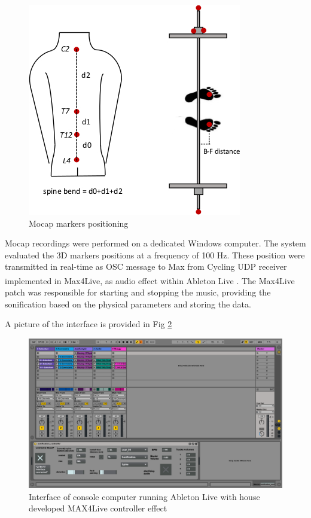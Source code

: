 \documentclass[10pt,letterpaper]{article}
\begin{document}
\begin{figure}[!h]
\center
\includegraphics[width=.8\textwidth]{figures/Sketch_spine_final.jpg}
\caption{Mocap markers positioning}
\label{fig:sketch_quantities}      
\end{figure}


Mocap recordings were performed on a dedicated Windows computer. The system evaluated the 3D markers positions at a frequency of 100 Hz. These position were transmitted in real-time as OSC message to Max from Cycling UDP receiver implemented in Max4Live, as audio effect within Ableton Live\textsuperscript{\textregistered} . The Max4Live patch was responsible for starting and stopping the music, providing the sonification based on the physical parameters and storing the data.

A picture of the interface is provided in Fig \ref{fig:interface}
\begin{figure}[!h]
\center
\includegraphics[width=.6\textwidth]{figures/interface.png}
\caption{Interface of console computer running Ableton Live with house developed MAX4Live controller effect}
\label{fig:interface}      
\end{figure}
\end{document}
